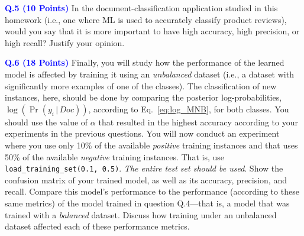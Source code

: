 \documentclass[letterpaper]{article}
\newcommand{\HIGHLIGHT}[1]{\textcolor{blue}{\textbf{#1}}}
\begin{document}
\noindent \HIGHLIGHT{Q.5 (10 Points)} In the document-classification application studied in this homework (i.e., one where ML is used to accurately classify product reviews), would you say that it is more important to have high accuracy, high precision, or high recall? Justify your opinion.
%
%





\noindent \HIGHLIGHT{Q.6 (18 Points)} Finally, you will study how the performance of the learned model is affected by training it using an \textit{unbalanced} dataset (i.e., a dataset with significantly more examples of one of the classes). The classification of new instances, here, should be done by comparing the posterior log-probabilities, $\log(\Pr(y_i \, | \, Doc))$, according to Eq.~\eqref{eq:log_MNB}, for both classes. You should use the value of $\alpha$ that resulted in the highest accuracy according to your experiments in the previous questions. You will now conduct an experiment where you use only 10\% of the available \textit{positive} training instances and that uses  50\% of the available \textit{negative} training instances. That is, use \texttt{load\_training\_set(0.1, 0.5)}. \textit{The entire test set should be used}. Show the confusion matrix of your trained model, as well as its accuracy, precision, and recall. Compare this model's performance to the performance (according to these same metrics) of the model trained in question Q.4---that is, a model that was trained with a \textit{balanced} dataset. Discuss how training under an unbalanced dataset affected each of these performance metrics.
%
%
\end{document}

